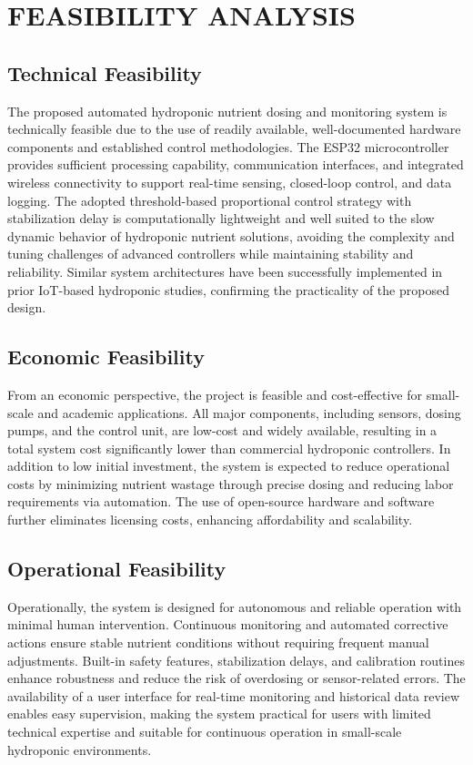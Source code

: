 \chapter{FEASIBILITY ANALYSIS}
\section{Technical Feasibility}
 The proposed automated hydroponic nutrient dosing and monitoring system is technically feasible due to the use of readily available, well-documented hardware components and established control methodologies. The ESP32 microcontroller provides sufficient processing capability, communication interfaces, and integrated wireless connectivity to support real-time sensing, closed-loop control, and data logging. The adopted threshold-based proportional control strategy with stabilization delay is computationally lightweight and well suited to the slow dynamic behavior of hydroponic nutrient solutions, avoiding the complexity and tuning challenges of advanced controllers while maintaining stability and reliability. Similar system architectures have been successfully implemented in prior IoT-based hydroponic studies, confirming the practicality of the proposed design.
 
\section{Economic Feasibility}
 From an economic perspective, the project is feasible and cost-effective for small-scale and academic applications. All major components, including sensors, dosing pumps, and the control unit, are low-cost and widely available, resulting in a total system cost significantly lower than commercial hydroponic controllers. In addition to low initial investment, the system is expected to reduce operational costs by minimizing nutrient wastage through precise dosing and reducing labor requirements via automation. The use of open-source hardware and software further eliminates licensing costs, enhancing affordability and scalability.
 
\section{Operational Feasibility}
 Operationally, the system is designed for autonomous and reliable operation with minimal human intervention. Continuous monitoring and automated corrective actions ensure stable nutrient conditions without requiring frequent manual adjustments. Built-in safety features, stabilization delays, and calibration routines enhance robustness and reduce the risk of overdosing or sensor-related errors. The availability of a user interface for real-time monitoring and historical data review enables easy supervision, making the system practical for users with limited technical expertise and suitable for continuous operation in small-scale hydroponic environments.